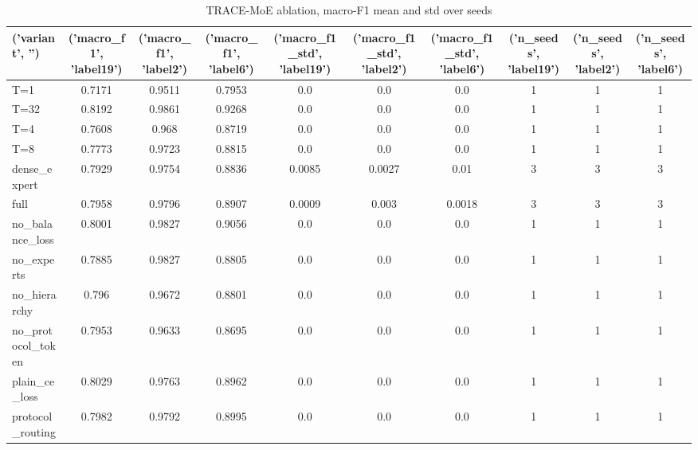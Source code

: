 \begin{table}[htbp]
\centering
\caption{TRACE-MoE ablation, macro-F1 mean and std over seeds}
\label{tab:ablation}
\begin{tabular}{lccccccccc}
\toprule
('variant', '') & ('macro\_f1', 'label19') & ('macro\_f1', 'label2') & ('macro\_f1', 'label6') & ('macro\_f1\_std', 'label19') & ('macro\_f1\_std', 'label2') & ('macro\_f1\_std', 'label6') & ('n\_seeds', 'label19') & ('n\_seeds', 'label2') & ('n\_seeds', 'label6') \\
\midrule
T=1 & 0.7171 & 0.9511 & 0.7953 & 0.0 & 0.0 & 0.0 & 1 & 1 & 1 \\
T=32 & 0.8192 & 0.9861 & 0.9268 & 0.0 & 0.0 & 0.0 & 1 & 1 & 1 \\
T=4 & 0.7608 & 0.968 & 0.8719 & 0.0 & 0.0 & 0.0 & 1 & 1 & 1 \\
T=8 & 0.7773 & 0.9723 & 0.8815 & 0.0 & 0.0 & 0.0 & 1 & 1 & 1 \\
dense\_expert & 0.7929 & 0.9754 & 0.8836 & 0.0085 & 0.0027 & 0.01 & 3 & 3 & 3 \\
full & 0.7958 & 0.9796 & 0.8907 & 0.0009 & 0.003 & 0.0018 & 3 & 3 & 3 \\
no\_balance\_loss & 0.8001 & 0.9827 & 0.9056 & 0.0 & 0.0 & 0.0 & 1 & 1 & 1 \\
no\_experts & 0.7885 & 0.9827 & 0.8805 & 0.0 & 0.0 & 0.0 & 1 & 1 & 1 \\
no\_hierarchy & 0.796 & 0.9672 & 0.8801 & 0.0 & 0.0 & 0.0 & 1 & 1 & 1 \\
no\_protocol\_token & 0.7953 & 0.9633 & 0.8695 & 0.0 & 0.0 & 0.0 & 1 & 1 & 1 \\
plain\_ce\_loss & 0.8029 & 0.9763 & 0.8962 & 0.0 & 0.0 & 0.0 & 1 & 1 & 1 \\
protocol\_routing & 0.7982 & 0.9792 & 0.8995 & 0.0 & 0.0 & 0.0 & 1 & 1 & 1 \\
\bottomrule
\end{tabular}
\end{table}